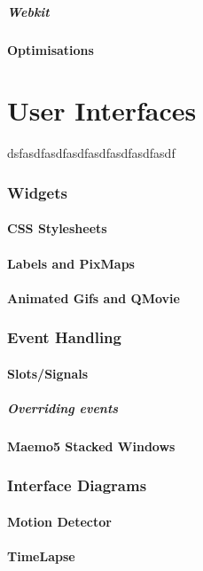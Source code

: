 \documentclass[11pt]{article} %
\begin{document}
\subsubsection{Webkit}
\subsection{Optimisations}


\part{User Interfaces}{dsfasdfasdfasdfasdfasdfasdfasdf}
\section{Widgets}
\subsection{CSS Stylesheets}
\subsection{Labels and PixMaps}
\subsection{Animated Gifs and QMovie}
\section{Event Handling}
\subsection{Slots/Signals}
\subsubsection{Overriding events}
\subsection{Maemo5 Stacked Windows}
\section{Interface Diagrams}
\subsection{Motion Detector}
\subsection{TimeLapse}
\end{document}
